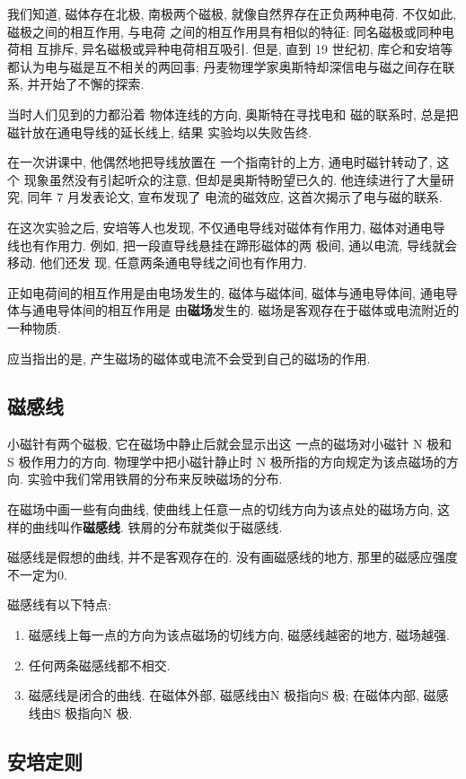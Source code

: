 \documentclass[11pt,a4paper]{ctexbook}
\begin{document}
我们知道, 磁体存在北极, 南极两个磁极, 就像自然界存在正负两种电荷.
不仅如此, 磁极之间的相互作用, 与电荷
之间的相互作用具有相似的特征: 同名磁极或同种电荷相
互排斥, 异名磁极或异种电荷相互吸引.
但是, 直到 19 世纪初, 库仑和安培等都认为电与磁是互不相关的两回事;
丹麦物理学家奥斯特却深信电与磁之间存在联系, 并开始了不懈的探索.

当时人们见到的力都沿着
物体连线的方向, 奥斯特在寻找电和
磁的联系时, 总是把磁针放在通电导线的延长线上, 结果
实验均以失败告终.

在一次讲课中, 他偶然地把导线放置在
一个指南针的上方, 通电时磁针转动了, 这个
现象虽然没有引起听众的注意, 但却是奥斯特盼望已久的.
他连续进行了大量研究, 同年 7 月发表论文, 宣布发现了
电流的磁效应, 这首次揭示了电与磁的联系.

在这次实验之后, 安培等人也发现, 不仅通电导线对磁体有作用力, 磁体对通电导
线也有作用力. 例如, 把一段直导线悬挂在蹄形磁体的两
极间, 通以电流, 导线就会移动. 他们还发
现, 任意两条通电导线之间也有作用力.

正如电荷间的相互作用是由电场发生的, 磁体与磁体间, 磁体与通电导体间,
通电导体与通电导体间的相互作用是
由\textbf{磁场}发生的. 磁场是客观存在于磁体或电流附近的一种物质.

应当指出的是, 产生磁场的磁体或电流不会受到自己的磁场的作用.

\subsection{磁感线}
小磁针有两个磁极, 它在磁场中静止后就会显示出这
一点的磁场对小磁针 N 极和 S 极作用力的方向.
物理学中把小磁针静止时 N 极所指的方向规定为该点磁场的方向.
实验中我们常用铁屑的分布来反映磁场的分布.

在磁场中画一些有向曲线, 使曲线上任意一点的切线方向为该点处的磁场方向,
这样的曲线叫作\textbf{磁感线}. 铁屑的分布就类似于磁感线.

磁感线是假想的曲线, 并不是客观存在的. 没有画磁感线的地方, 那里的磁感应强度不一定为0.

磁感线有以下特点:
\begin{enumerate}
    \item 磁感线上每一点的方向为该点磁场的切线方向, 磁感线越密的地方, 磁场越强.
    \item 任何两条磁感线都不相交.
    \item 磁感线是闭合的曲线. 在磁体外部, 磁感线由N 极指向S 极; 在磁体内部,
    磁感线由S 极指向N 极.
\end{enumerate}

\subsection{安培定则}
\end{document}
